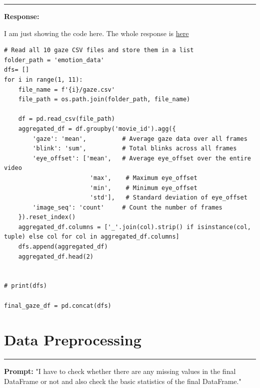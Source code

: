 \documentclass[11pt,a4paper]{article}
\begin{document}
\begin{center}
    \color{red}\rule{1\linewidth}{0.5mm}
\end{center}

\textbf{Response:}
\begin{tcolorbox}
I am just showing the code here. The whole response is \href{https://chatgpt.com/share/66eacd2e-b8f8-8009-8507-b3895c422e0b}{here}
    \begin{lstlisting}
# Read all 10 gaze CSV files and store them in a list
folder_path = 'emotion_data'
dfs= []
for i in range(1, 11):
    file_name = f'{i}/gaze.csv'
    file_path = os.path.join(folder_path, file_name)
    
    df = pd.read_csv(file_path)
    aggregated_df = df.groupby('movie_id').agg({
        'gaze': 'mean',          # Average gaze data over all frames
        'blink': 'sum',          # Total blinks across all frames
        'eye_offset': ['mean',   # Average eye_offset over the entire video
                        'max',    # Maximum eye_offset
                        'min',    # Minimum eye_offset
                        'std'],   # Standard deviation of eye_offset
        'image_seq': 'count'     # Count the number of frames
    }).reset_index()
    aggregated_df.columns = ['_'.join(col).strip() if isinstance(col, tuple) else col for col in aggregated_df.columns]
    dfs.append(aggregated_df)
    aggregated_df.head(2)

    
# print(dfs)

final_gaze_df = pd.concat(dfs)
\end{lstlisting}
\end{tcolorbox}
        

\section{Data Preprocessing}
\begin{center}
    \color{red}\rule{1\linewidth}{2mm}
\end{center}
\label{sec:preprocessing}

\textbf{Prompt:} "I have to check whether there are any missing values in the final DataFrame or not and also check the basic statistics of the final DataFrame."
\end{document}
